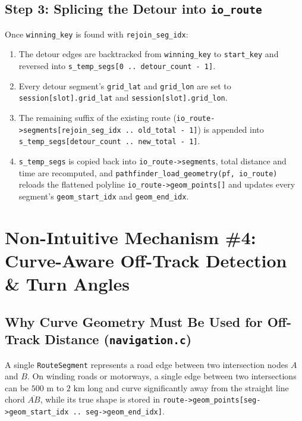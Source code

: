 \documentclass[11pt,a4paper]{article}
\begin{document}
\subsection{Step 3: Splicing the Detour into \texttt{io\_route}}

Once \texttt{winning\_key} is found with \texttt{rejoin\_seg\_idx}:
\begin{enumerate}
    \item The detour edges are backtracked from \texttt{winning\_key} to \texttt{start\_key} and reversed into \texttt{s\_temp\_segs[0 .. detour\_count - 1]}.
    \item Every detour segment's \texttt{grid\_lat} and \texttt{grid\_lon} are set to \texttt{session[slot].grid\_lat} and \texttt{session[slot].grid\_lon}.
    \item The remaining suffix of the existing route (\texttt{io\_route->segments[rejoin\_seg\_idx .. old\_total - 1]}) is appended into \texttt{s\_temp\_segs[detour\_count .. new\_total - 1]}.
    \item \texttt{s\_temp\_segs} is copied back into \texttt{io\_route->segments}, total distance and time are recomputed, and \texttt{pathfinder\_load\_geometry(pf, io\_route)} reloads the flattened polyline \texttt{io\_route->geom\_points[]} and updates every segment's \texttt{geom\_start\_idx} and \texttt{geom\_end\_idx}.
\end{enumerate}

\section{Non-Intuitive Mechanism \#4: Curve-Aware Off-Track Detection \& Turn Angles}

\subsection{Why Curve Geometry Must Be Used for Off-Track Distance (\texttt{navigation.c})}

A single \texttt{RouteSegment} represents a road edge between two intersection nodes $A$ and $B$. On winding roads or motorways, a single edge between two intersections can be $500\text{ m}$ to $2\text{ km}$ long and curve significantly away from the straight line chord $\overline{AB}$, while its true shape is stored in \texttt{route->geom\_points[seg->geom\_start\_idx .. seg->geom\_end\_idx]}.
\end{document}
